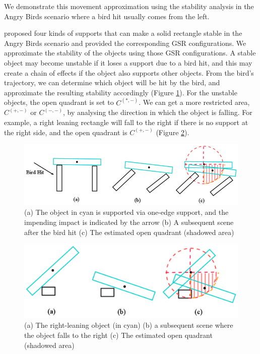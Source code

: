 \documentclass[letterpaper]{article}
\begin{document}
We demonstrate this movement approximation using the stability analysis in the Angry Birds scenario where a bird hit usually comes from the left. 

\cite{Ge2013} proposed four kinds of supports that can make a solid rectangle stable in the Angry Birds scenario and provided the corresponding GSR configurations. We approximate the stability of the objects using those GSR configurations. A stable object may become unstable if it loses a support due to a bird hit, and this may create a chain of effects if the object also supports other objects. From the bird's trajectory, we can determine which object will be hit by the bird, and approximate the resulting stability accordingly (Figure \ref{BirdImpact}). For the unstable objects, the open quadrant is set to $C^{(*,-)}$. We can get a more restricted area, $C^{(+,-)}$ or $C^{(-,-)}$, by analysing the direction in which the object is falling. For example, a right leaning rectangle will fall to the right if there is no support at the right side, and the open quadrant is $C^{(+,-)}$ (Figure \ref{QudrantsEstimation}). 

\begin{figure}[h!]
\centering\includegraphics[scale=0.35]{BirdImpact.png}\caption{(a) The object in cyan is supported via one-edge support, and the impending impact is indicated by the arrow (b) A subsequent scene after the bird hit (c) The estimated open quadrant (shadowed area)}
\label{BirdImpact}
\end{figure}

\begin{figure}[h!]
\centering\includegraphics[scale=0.4]{QudrantsEstimation.png}\caption{(a) The right-leaning object (in cyan)  (b) a subsequent scene where the object falls to the right (c) The estimated open quadrant (shadowed area)}
\label{QudrantsEstimation}
\end{figure}
\end{document}
